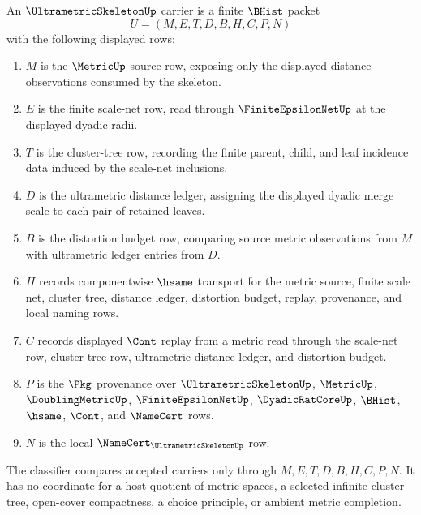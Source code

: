 \begin{definition}
\label{def:ultrametric-skeleton-carrier}
An $\UltrametricSkeletonUp$ carrier is a finite $\BHist$ packet
$$
U=(M,E,T,D,B,H,C,P,N)
$$
with the following displayed rows:
\begin{enumerate}
\item $M$ is the $\MetricUp$ source row, exposing only the displayed distance observations consumed by the skeleton.
\item $E$ is the finite scale-net row, read through $\FiniteEpsilonNetUp$ at the displayed dyadic radii.
\item $T$ is the cluster-tree row, recording the finite parent, child, and leaf incidence data induced by the scale-net inclusions.
\item $D$ is the ultrametric distance ledger, assigning the displayed dyadic merge scale to each pair of retained leaves.
\item $B$ is the distortion budget row, comparing source metric observations from $M$ with ultrametric ledger entries from $D$.
\item $H$ records componentwise $\hsame$ transport for the metric source, finite scale net, cluster tree, distance ledger, distortion budget, replay, provenance, and local naming rows.
\item $C$ records displayed $\Cont$ replay from a metric read through the scale-net row, cluster-tree row, ultrametric distance ledger, and distortion budget.
\item $P$ is the $\Pkg$ provenance over $\UltrametricSkeletonUp$, $\MetricUp$, $\DoublingMetricUp$, $\FiniteEpsilonNetUp$, $\DyadicRatCoreUp$, $\BHist$, $\hsame$, $\Cont$, and $\NameCert$ rows.
\item $N$ is the local $\NameCert_{\UltrametricSkeletonUp}$ row.
\end{enumerate}
The classifier compares accepted carriers only through $M,E,T,D,B,H,C,P,N$. It has no coordinate for a host quotient of metric spaces, a selected infinite cluster tree, open-cover compactness, a choice principle, or ambient metric completion.
\end{definition}

